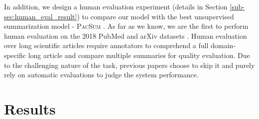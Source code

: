 \documentclass[11pt,a4paper]{article}
\begin{document}
In addition, we design a human evaluation experiment (details in Section \ref{sub-sec:human_eval_result}) to compare our model with the best unsupervised summarization model - \textsc{PacSum} \citep{zheng2019sentence}. As far as we know, we are the first to perform human evaluation on the 2018 PubMed and arXiv datasets \citep{cohan2018discourse}.  Human evaluation over long scientific articles require annotators to comprehend a full domain-specific long article and compare multiple summaries for quality evaluation. Due to the challenging nature of the task,  previous papers choose to skip it and purely rely on automatic evaluations to judge the system performance. 




\section{Results}
\end{document}
